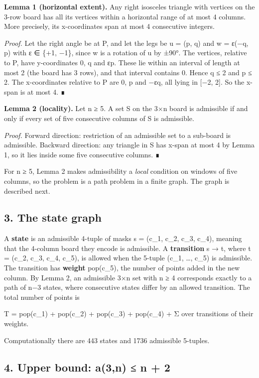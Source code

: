 \documentclass[
  11pt,
]{article}
\begin{document}
\textbf{Lemma 1 (horizontal extent).} Any right isosceles triangle with
vertices on the 3-row board has all its vertices within a horizontal
range of at most 4 columns. More precisely, its x-coordinates span at
most 4 consecutive integers.

\emph{Proof.} Let the right angle be at P, and let the legs be u = (p,
q) and w = ε(−q, p) with ε ∈ \{+1, −1\}, since w is a rotation of u by
±90°. The vertices, relative to P, have y-coordinates 0, q and εp. These
lie within an interval of length at most 2 (the board has 3 rows), and
that interval contains 0. Hence \textbar q\textbar{} ≤ 2 and
\textbar p\textbar{} ≤ 2. The x-coordinates relative to P are 0, p and
−εq, all lying in {[}−2, 2{]}. So the x-span is at most 4. ∎

\textbf{Lemma 2 (locality).} Let n ≥ 5. A set S on the 3×n board is
admissible if and only if every set of five consecutive columns of S is
admissible.

\emph{Proof.} Forward direction: restriction of an admissible set to a
sub-board is admissible. Backward direction: any triangle in S has
x-span at most 4 by Lemma 1, so it lies inside some five consecutive
columns. ∎

For n ≥ 5, Lemma 2 makes admissibility a \emph{local} condition on
windows of five columns, so the problem is a path problem in a finite
graph. The graph is described next.

\subsection{3. The state graph}\label{the-state-graph}

A \textbf{state} is an admissible 4-tuple of masks s = (c\_1, c\_2,
c\_3, c\_4), meaning that the 4-column board they encode is admissible.
A \textbf{transition} s → t, where t = (c\_2, c\_3, c\_4, c\_5), is
allowed when the 5-tuple (c\_1, \ldots, c\_5) is admissible. The
transition has \textbf{weight} pop(c\_5), the number of points added in
the new column. By Lemma 2, an admissible 3×n set with n ≥ 4 corresponds
exactly to a path of n−3 states, where consecutive states differ by an
allowed transition. The total number of points is

T = pop(c\_1) + pop(c\_2) + pop(c\_3) + pop(c\_4) + Σ over transitions
of their weights.

Computationally there are 443 states and 1736 admissible 5-tuples.

\subsection{4. Upper bound: a(3,n) ≤ n + 2}\label{upper-bound-a3n-n-2}
\end{document}
